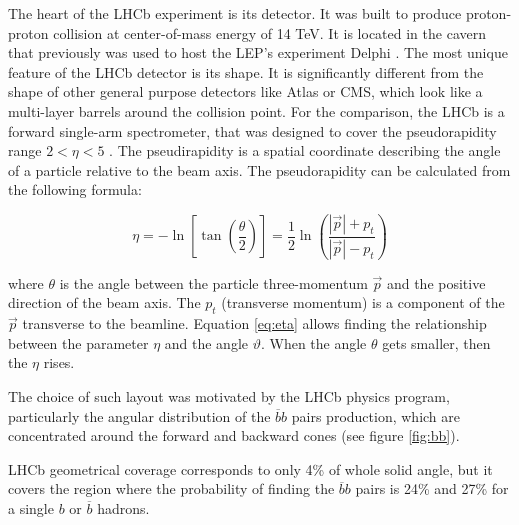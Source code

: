 The heart of the LHCb experiment is its detector. It was built to produce proton-proton collision at center-of-mass energy of 14 TeV. It is located in the cavern that previously was used to host the LEP's experiment Delphi \cite{deplhi}. The most unique feature of the LHCb detector is its shape. It is significantly different from the shape of other general purpose detectors like Atlas or CMS, which look like a multi-layer barrels around the collision point. For the comparison, the LHCb is a forward single-arm spectrometer, that was designed to cover the pseudorapidity range $2< \eta < 5 $  \cite{lhcb}. The pseudirapidity is a spatial coordinate describing the angle of a particle relative to the beam axis. The  pseudorapidity can be calculated from the following formula: 

\begin{equation}
    \eta = - \ln\left[ \tan \left( \frac{\theta }{2}\right) \right]\nonumber = \frac{1}{2} \ln \left( \frac{|\vec{p}|+ p_t}{|\vec{p}|- p_t}  \right)
    \label{eq:eta}
\end{equation}

where $\theta$  is the angle between the particle three-momentum $\vec{p}$ and the positive direction of the beam axis. The $p_t$ (transverse momentum) is a component of the $\vec{p}$ transverse to the beamline.
Equation \ref{eq:eta} allows finding the relationship between the parameter $\eta$ and the angle $\vartheta$. When the angle $\theta$ gets smaller, then the $\eta$ rises.


The choice of such layout was motivated by the LHCb physics program, particularly the angular distribution of the $\overline{b}b$ pairs production, which are concentrated around the forward and backward cones (see figure \ref{fig:bb}).

LHCb geometrical coverage corresponds to only 4\% of whole solid angle, but it covers the region where the probability of finding the  $\overline{b}b$ pairs is 24\% and 27\% for a single $b$ or $\overline{b}$ hadrons. 


